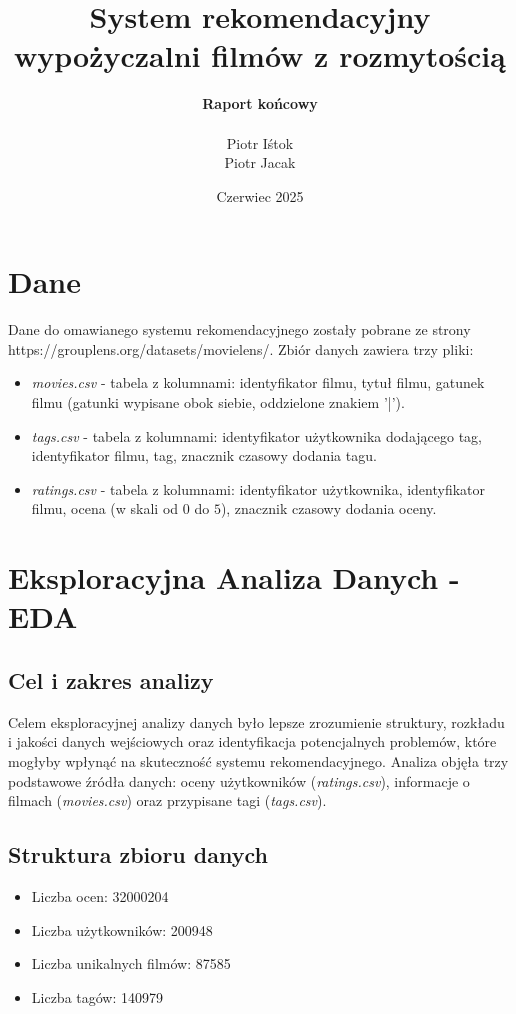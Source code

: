 \documentclass{article}
\title{System rekomendacyjny wypożyczalni filmów z rozmytością}
\author{\textbf{Raport końcowy} \\ \\ Piotr Iśtok \\ Piotr Jacak}
\date{Czerwiec 2025}
\begin{document}
\maketitle


\tableofcontents
\newpage

\section{Dane}
Dane do omawianego systemu rekomendacyjnego zostały pobrane ze strony https://grouplens.org/datasets/movielens/. Zbiór danych zawiera trzy pliki:
\begin{itemize}
    \item \textit{movies.csv} - tabela z kolumnami: identyfikator filmu, tytuł filmu, gatunek filmu (gatunki wypisane obok siebie, oddzielone znakiem '|').
    \item \textit{tags.csv} - tabela z kolumnami: identyfikator użytkownika dodającego tag, identyfikator filmu, tag, znacznik czasowy dodania tagu.
    \item \textit{ratings.csv} - tabela z kolumnami: identyfikator użytkownika, identyfikator filmu, ocena (w skali od $0$ do $5$), znacznik czasowy dodania oceny. 
\end{itemize}

\section{Eksploracyjna Analiza Danych - EDA}
\subsection{Cel i zakres analizy}
Celem eksploracyjnej analizy danych było lepsze zrozumienie struktury, rozkładu i jakości danych wejściowych oraz identyfikacja potencjalnych problemów, które mogłyby wpłynąć na skuteczność systemu rekomendacyjnego. Analiza objęła trzy podstawowe źródła danych: oceny użytkowników (\textit{ratings.csv}), informacje o filmach (\textit{movies.csv}) oraz przypisane tagi (\textit{tags.csv}).

\subsection{Struktura zbioru danych}
\begin{itemize}
    \item Liczba ocen: 32000204
    \item Liczba użytkowników: 200948
    \item Liczba unikalnych filmów: 87585
    \item Liczba tagów: 140979
\end{itemize}
\end{document}
